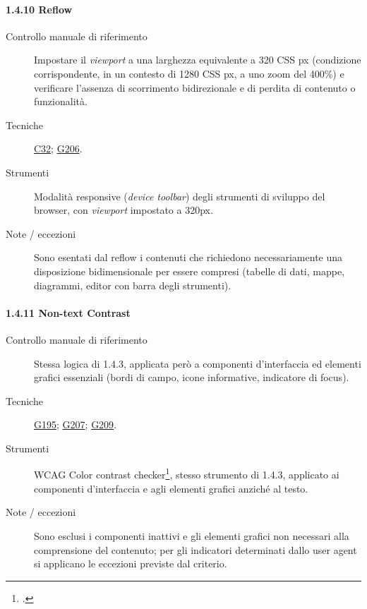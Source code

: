 \paragraph*{1.4.10 Reflow}
\begin{description}
\item[Controllo manuale di riferimento] Impostare il \emph{viewport} a una larghezza equivalente a 320 CSS px (condizione corrispondente, in un contesto di 1280 CSS px, a uno zoom del 400\%) e verificare l'assenza di scorrimento bidirezionale e di perdita di contenuto o funzionalità.
\item[Tecniche] \href{https://www.w3.org/WAI/WCAG21/Techniques/css/C32.html}{C32}; \href{https://www.w3.org/WAI/WCAG21/Techniques/general/G206.html}{G206}.
\item[Strumenti] Modalità responsive (\emph{device toolbar}) degli strumenti di sviluppo del browser, con \emph{viewport} impostato a 320px.
\item[Note / eccezioni] Sono esentati dal reflow i contenuti che richiedono necessariamente una disposizione bidimensionale per essere compresi (tabelle di dati, mappe, diagrammi, editor con barra degli strumenti).
\end{description}

\paragraph*{1.4.11 Non-text Contrast}
\begin{description}
\item[Controllo manuale di riferimento] Stessa logica di 1.4.3, applicata però a componenti d'interfaccia ed elementi grafici essenziali (bordi di campo, icone informative, indicatore di focus).
\item[Tecniche] \href{https://www.w3.org/WAI/WCAG21/Techniques/general/G195.html}{G195}; \href{https://www.w3.org/WAI/WCAG21/Techniques/general/G207.html}{G207}; \href{https://www.w3.org/WAI/WCAG22/Techniques/general/G209}{G209}.
\item[Strumenti] WCAG Color contrast checker\footcite{wcag:colorcontrastchecker}, stesso strumento di 1.4.3, applicato ai componenti d'interfaccia e agli elementi grafici anziché al testo.
\item[Note / eccezioni] Sono esclusi i componenti inattivi e gli elementi grafici non necessari alla comprensione del contenuto; per gli indicatori determinati dallo user agent si applicano le eccezioni previste dal criterio.
\end{description}

